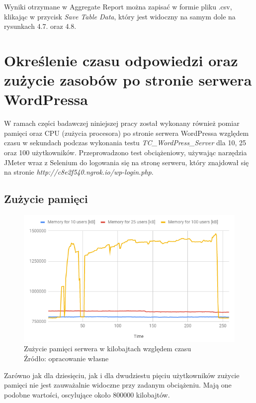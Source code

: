 Wyniki otrzymane w Aggregate Report można zapisać w formie pliku .csv, klikając w przycisk \textit{Save Table Data}, który jest widoczny na samym dole na rysunkach 4.7. oraz 4.8.

\section{Określenie czasu odpowiedzi oraz zużycie zasobów po stronie serwera WordPressa}

W ramach części badawczej niniejszej pracy został wykonany również pomiar pamięci oraz CPU (zużycia procesora) po stronie serwera WordPressa względem czasu w sekundach podczas wykonania testu \textit{TC\_WordPress\_Server} dla 10, 25 oraz 100 użytkowników. Przeprowadzono test obciążeniowy, używając narzędzia JMeter wraz z Selenium do logowania się na stronę serweru, który znajdował się na stronie 
\newline
\textit{http://c8e2f540.ngrok.io/wp-login.php}.

\subsection{Zużycie pamięci}

\begin{figure}[H]
\centering
\captionsetup{justification=centering}
\includegraphics[width=1\textwidth]{Memory.PNG}
\caption[Zużycie pamięci serwera w kilobajtach względem czasu]{\label{fig:ham}Zużycie pamięci serwera w kilobajtach względem czasu  \\ Źródło: opracowanie własne}
\end{figure}

Zarówno jak dla dziesięciu, jak i dla dwudziestu pięciu użytkowników zużycie pamięci nie jest zauważalnie widoczne przy zadanym obciążeniu. Mają one podobne wartości, oscylujące około 800000 kilobajtów. 


